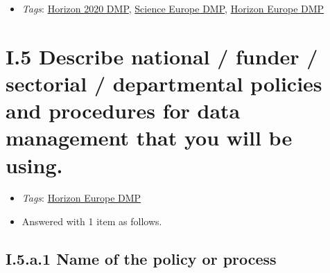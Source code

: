 \documentclass[a4paper,12pt]{report}
\begin{document}
\label{1e85da40-bbfc-4180-903e-6c569ed2da38.09c7c989-6461-417f-b09e-228491c051c6.5d0b87a6-93d5-4b33-a13f-e8b5da23904f.89af6cc3-cdc5-4d3f-9082-e02c063e0635}


\begin{itemize}
  \item \textit{Tags}: \ul{Horizon 2020 DMP}, \ul{Science Europe DMP}, \ul{Horizon Europe DMP}
  \end{itemize}






\section*{\protect\textcolor{colorSecId}{I.5} Describe national / funder / sectorial / departmental policies and procedures for data management that you will be using.}

\label{1e85da40-bbfc-4180-903e-6c569ed2da38.87964502-4401-45e5-9084-d6c84a417acf}


\begin{itemize}
  \item \textit{Tags}: \ul{Horizon Europe DMP}
  \end{itemize}



\begin{itemize}
  \item[\ArrowBoldDownRight] Answered with 1 item as follows.
\end{itemize}%
\subsection*{\protect\textcolor{colorSecId}{I.5.a.1} Name of the policy or process}

\label{1e85da40-bbfc-4180-903e-6c569ed2da38.87964502-4401-45e5-9084-d6c84a417acf.98627fd2-543a-44cc-9027-b325999767b1.34058487-d9e7-41af-be6a-aba67200b8d2}
\end{document}
